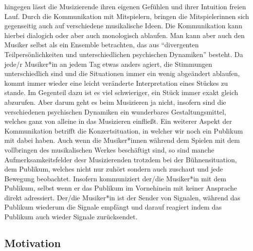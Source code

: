 hingegen lässt die Musizierende ihren eigenen Gefühlen und ihrer Intuition
freien Lauf. Durch die Kommunikation mit Mitspielern, bringen die
Mitspielerinnen sich gegenseitig auch auf verschiedene musikalische Ideen. Die
Kommunikation kann hierbei dialogich oder aber auch monologisch ablaufen.
\autocite[61]{doerne:umfassend_musizieren} Man kann aber auch den Musiker selbst
als ein Ensemble betrachten, das aus \enquote{divergenten Teilpersönlichkeiten
und unterschiedlichen psychischen Dynamiken} besteht.
\autocite[64]{doerne:umfassend_musizieren} Da jede/r Musiker*in an jedem Tag etwas
anders agiert, die Stimmungen unterschiedlich sind und die Situationen immer
ein wenig abgeändert ablaufen, kommt immer wieder eine leicht veränderte
Interpretation eines Stückes zu stande. Im Gegenteil dazu ist es viel
schwieriger, ein Stück immer exakt gleich abzurufen. Aber darum geht es beim
Musizieren ja nicht, insofern sind die verschiedenen psychischen Dynamiken ein
wunderbares Gestaltungsmittel, welches ganz von alleine in das Musizieren
einfließt. Ein weiterer Aspekt der Kommunikation betrifft die Konzertsituation,
in welcher wir noch ein Publikum mit dabei haben. Auch wenn die Musiker*innen während
dem Spielen mit dem vollbringen des musikalischen Werkes beschäftigt sind, so
sind manche Aufmerksamkeitsfelder desr Musizierenden trotzdem bei der
Bühnensituation, dem Publikum, welches nicht nur zuhört sondern auch zuschaut
und jede Bewegung beobachtet. Insofern kommuniziert der/die Musiker*in mit dem
Publikum, selbst wenn er das Publikum im Vornehinein mit keiner Ansprache direkt
adressiert. Der/die Musiker*in ist der Sender von Signalen, während das Publikum
wiederum die Signale empfängt und darauf reagiert indem das Publikum auch wieder
Signale zurücksendet. 



\subsection{Motivation}

